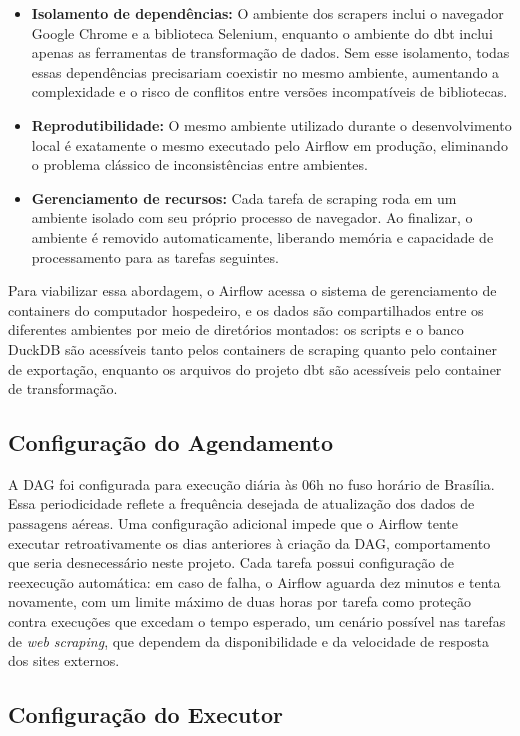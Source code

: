 \begin{itemize}
    \item \textbf{Isolamento de dependências:} O ambiente dos scrapers inclui o navegador Google Chrome e a biblioteca Selenium, enquanto o ambiente do dbt inclui apenas as ferramentas de transformação de dados. Sem esse isolamento, todas essas dependências precisariam coexistir no mesmo ambiente, aumentando a complexidade e o risco de conflitos entre versões incompatíveis de bibliotecas.
    \item \textbf{Reprodutibilidade:} O mesmo ambiente utilizado durante o desenvolvimento local é exatamente o mesmo executado pelo Airflow em produção, eliminando o problema clássico de inconsistências entre ambientes.
    \item \textbf{Gerenciamento de recursos:} Cada tarefa de scraping roda em um ambiente isolado com seu próprio processo de navegador. Ao finalizar, o ambiente é removido automaticamente, liberando memória e capacidade de processamento para as tarefas seguintes.
\end{itemize}

Para viabilizar essa abordagem, o Airflow acessa o sistema de gerenciamento de containers do computador hospedeiro, e os dados são compartilhados entre os diferentes ambientes por meio de diretórios montados: os scripts e o banco DuckDB são acessíveis tanto pelos containers de scraping quanto pelo container de exportação, enquanto os arquivos do projeto dbt são acessíveis pelo container de transformação.

\subsection{Configuração do Agendamento}

A DAG foi configurada para execução diária às 06h no fuso horário de Brasília. Essa periodicidade reflete a frequência desejada de atualização dos dados de passagens aéreas. Uma configuração adicional impede que o Airflow tente executar retroativamente os dias anteriores à criação da DAG, comportamento que seria desnecessário neste projeto. Cada tarefa possui configuração de reexecução automática: em caso de falha, o Airflow aguarda dez minutos e tenta novamente, com um limite máximo de duas horas por tarefa como proteção contra execuções que excedam o tempo esperado, um cenário possível nas tarefas de \textit{web scraping}, que dependem da disponibilidade e da velocidade de resposta dos sites externos.

\subsection{Configuração do Executor}


